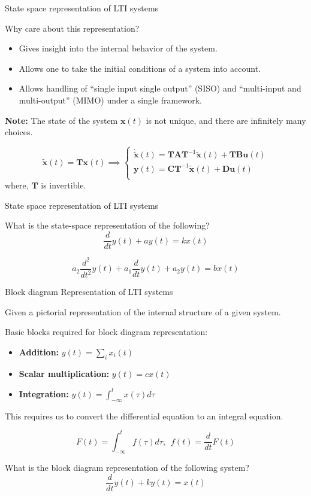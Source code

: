 \documentclass{beamer}
\begin{document}
\begin{frame}{State space representation of LTI systems}
 
Why care about this representation?
\begin{itemize}
\item Gives insight into the internal behavior of the system.
\item Allows one to take the initial conditions of a system into account.
\item Allows handling of ``single input single output'' (SISO) and ``multi-input and multi-output'' (MIMO) under a single framework.
\end{itemize}

\textbf{Note:} The state of the system $\mathbf{x}(t)$ is not unique, and there are infinitely many choices.

\[ \tilde{\mathbf{x}}(t) = \mathbf{T}\mathbf{x}(t) \implies \begin{cases}
\dot{\tilde{\mathbf{x}}}(t) = \mathbf{T}\mathbf{A}\mathbf{T}^{-1}\tilde{\mathbf{x}}(t) + \mathbf{T}\mathbf{B}\mathbf{u}(t) \\
\mathbf{y}(t) = \mathbf{C}\mathbf{T}^{-1}\tilde{\mathbf{x}}(t) + \mathbf{D}\mathbf{u}(t) \\
\end{cases} \]
where, $\mathbf{T}$ is invertible.
\end{frame}

\begin{frame}{State space representation of LTI systems}

What is the state-space representation of the following?
\[ \frac{d}{dt}y(t) + ay(t) = kx(t) \]

\[ a_2\frac{d^2}{dt^2}y(t) + a_1\frac{d}{dt}y(t) + a_2y(t) = bx(t) \]
\end{frame}

\begin{frame}{Block diagram Representation of LTI systems}

Given a pictorial representation of the internal structure of a given system.
\vspace{2mm}

Basic blocks required for block diagram representation:
\begin{itemize}
\item \textbf{Addition:} $ y(t) = \sum_{i} x_i(t) $
\item \textbf{Scalar multiplication:} $ y(t) = cx(t) $
\item \textbf{Integration:} $ y(t) = \int_{-\infty}^{t} x(\tau)d\tau $
\end{itemize}

This requires us to convert the differential equation to an integral equation.
\vspace{2mm}

\[ F(t) = \int_{-\infty}^{t} f(\tau)d\tau, \,\,\, f(t) = \frac{d}{dt}F(t) \]

What is the block diagram representation of the following system?
\[\frac{d}{dt}y\left(t\right) + ky\left(t\right) = x\left(t\right) \]

\end{frame}
\end{document}

